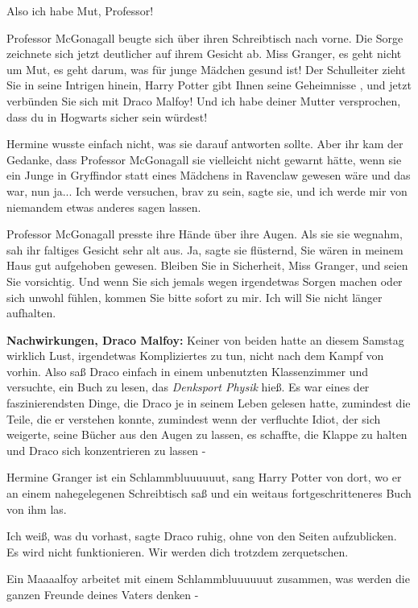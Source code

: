 \glqq{}Also ich habe Mut, Professor!\grqq{}

Professor McGonagall beugte sich über ihren Schreibtisch nach vorne. Die Sorge
zeichnete sich jetzt deutlicher auf ihrem Gesicht ab. \glqq{}Miss Granger, es
geht nicht um Mut, es geht darum, was für junge Mädchen gesund ist! Der
Schulleiter zieht Sie in seine Intrigen hinein, Harry Potter gibt Ihnen seine
Geheimnisse , und jetzt verbünden Sie sich mit Draco Malfoy! Und ich habe deiner
Mutter versprochen, dass du in Hogwarts sicher sein würdest!\grqq{}

Hermine wusste einfach nicht, was sie darauf antworten sollte. Aber ihr kam der
Gedanke, dass Professor McGonagall sie vielleicht nicht gewarnt hätte, wenn sie
ein Junge in Gryffindor statt eines Mädchens in Ravenclaw gewesen wäre und das
war, nun ja... \glqq{}Ich werde versuchen, brav zu sein\grqq{}, sagte sie, \glqq{}
und ich werde mir von niemandem etwas anderes sagen lassen.\grqq{}

Professor McGonagall presste ihre Hände über ihre Augen. Als sie sie wegnahm,
sah ihr faltiges Gesicht sehr alt aus. \glqq{}Ja\grqq{}, sagte sie flüsternd,
\glqq{}Sie wären in meinem Haus gut aufgehoben gewesen. Bleiben Sie in
Sicherheit, Miss Granger, und seien Sie vorsichtig. Und wenn Sie sich jemals
wegen irgendetwas Sorgen machen oder sich unwohl fühlen, kommen Sie bitte sofort
zu mir. Ich will Sie nicht länger aufhalten.\grqq{}

\textbf{Nachwirkungen, Draco Malfoy:}
Keiner von beiden hatte an diesem Samstag wirklich Lust, irgendetwas
Kompliziertes zu tun, nicht nach dem Kampf von vorhin. Also saß Draco einfach in
einem unbenutzten Klassenzimmer und versuchte, ein Buch zu lesen, das
\emph{\glqq{}Denksport Physik\grqq{}} hieß. Es war eines der faszinierendsten
Dinge, die Draco je in seinem Leben gelesen hatte, zumindest die Teile, die er
verstehen konnte, zumindest wenn der verfluchte Idiot, der sich weigerte, seine
Bücher aus den Augen zu lassen, es schaffte, die Klappe zu halten und Draco sich
konzentrieren zu lassen -

\glqq{}Hermine Granger ist ein Schlammbluuuuuut\grqq{}, sang Harry Potter von
dort, wo er an einem nahegelegenen Schreibtisch saß und ein weitaus
fortgeschritteneres Buch von ihm las.

\glqq{}Ich weiß, was du vorhast\grqq{}, sagte Draco ruhig, ohne von den Seiten
aufzublicken. \glqq{}Es wird nicht funktionieren. Wir werden dich trotzdem
zerquetschen.\grqq{}

\glqq{}Ein Maaaalfoy arbeitet mit einem Schlammbluuuuuut zusammen, was werden die
ganzen Freunde deines Vaters denken -\grqq{}

